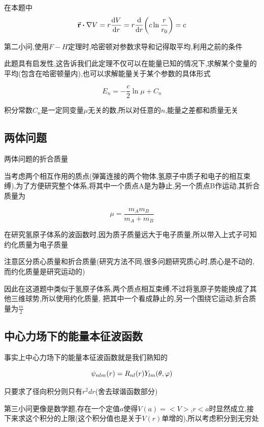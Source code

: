             在本题中
            $$ \va{r} \vdot \nabla V = r \dv{V}{r} = r \dv{r}(c \ln{\frac{r}{r_{0}}}) = c  $$

            第二小问,使用$F-H$定理时,哈密顿对参数求导和记得取平均,利用之前的条件

            此题具有启发性,这告诉我们此定理不仅可以在能量已知的情况下,求解某个变量的平均(包含在哈密顿量内),也可以求解能量关于某个参数的具体形式

            $$ E_{n} = - \frac{c}{2} \ln{\mu} + C_{n} $$
            
            积分常数$C_{n}$是一定同变量$\mu$无关的数,所以对任意的$n$,能量之差都和质量无关

        \subsection{两体问题}
            \begin{formal}
                两体问题的折合质量

                当考虑两个相互作用的质点(弹簧连接的两个物体,氢原子中质子和电子的相互束缚),为了方便研究整个体系,将其中一个质点A是为静止,另一个质点B作运动,其折合质量为
                
                $$ \mu = \dfrac{m_{A}m_{B}}{m_{A}+m_{B}} $$

                在研究氢原子体系的波函数时,因为质子质量远大于电子质量,所以带入上式子可知约化质量为电子质量

                注意区分质心质量和折合质量(研究方法不同,很多问题研究质心时,质心是不动的,而约化质量是研究运动的)

                因此在这道题中类似于氢原子体系,两个质点相互束缚,不过将氢原子势能换成了其他三维球势,所以使用约化质量,
                把其中一个看成静止的,另一个围绕它运动,折合质量为$\frac{m}{2}$
            \end{formal}
 


        \subsection{中心力场下的能量本征波函数}
            事实上中心力场下的能量本征波函数就是我们熟知的
            
                $$ \psi_{nlm} (r) = R_{nl}(r) Y_{lm}(\theta,\varphi) $$

            只要求了径向积分则只有$r^{2}dr$(舍去球谐函数部分)

            第三小问更像是数学题,存在一个定值$a$使得$V(a) = < V >$,$r<a$时显然成立,接下来求这个积分的上限(这个积分值也是关于$V(r)$单增的),所以考虑积分到无穷处

